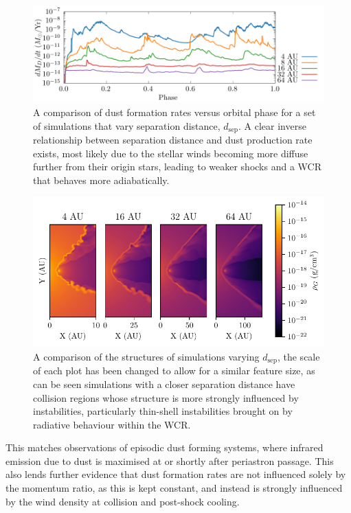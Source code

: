 \begin{figure}
  \centering
  \includegraphics{assets/dsep-results/dsep-phase-dust_rate.pdf}
  \caption[Dust formation rate versus binary separation distance]{A comparison of dust formation rates versus orbital phase for a set of simulations that vary separation distance, $d_\text{sep}$. A clear inverse relationship between separation distance and dust production rate exists, most likely due to the stellar winds becoming more diffuse further from their origin stars, leading to weaker shocks and a WCR that behaves more adiabatically.}
  \label{fig:dsepdustproduction}
\end{figure}

\begin{figure}
  \centering
  \includegraphics{assets/adiabatic-flow/instab-comp-rho.pdf}
  \caption[A comparison of the structures of simulations varying $d_\text{sep}$]{A comparison of the structures of simulations varying $d_\text{sep}$, the scale of each plot has been changed to allow for a similar feature size, as can be seen simulations with a closer separation distance have collision regions whose structure is more strongly influenced by instabilities, particularly thin-shell instabilities brought on by radiative behaviour within the WCR.}
  \label{fig:dsepinstabilities}
\end{figure}

This matches observations of episodic dust forming systems, where infrared emission due to dust is maximised at or shortly after periastron passage. This also lends further evidence that dust formation rates are not influenced solely by the momentum ratio, as this is kept constant, and instead is strongly influenced by the wind density at collision and post-shock cooling. 

